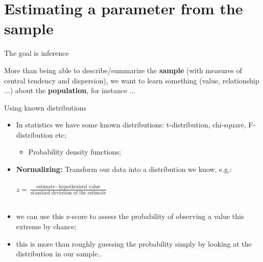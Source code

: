 \documentclass[10pt]{beamer}   %
\begin{document}


\section{Estimating a parameter from the sample}


\begin{frame}{The goal is inference}

More than being able to describe/summarize the \textbf{sample} (with measures of central tendency and dispersion), we want to learn something (value, relationship ...) about the \textbf{population}, for instance ...

\end{frame}


\begin{frame}{Using known distributions}


\begin{itemize}
\item In statistics we have some known distributions: t-distribution, chi-square, F-distribution etc;
\begin{itemize}
\item Probability density functions;
\end{itemize}
\item \textbf{Normalizing:} Transform our data into a distribution we know, e.g.:\\~\\ 
 $z=\frac{\text{estimate}-\text{hypothesized value}}{\text{standard deviation of the estimate}}$  \\~\\ 
\item we can use this z-score to assess the probability of observing a value this extreme by chance;
\item this is more than roughly guessing the probability simply by looking at the distribution in our sample..
\end{itemize}
\end{frame}


\end{document}
